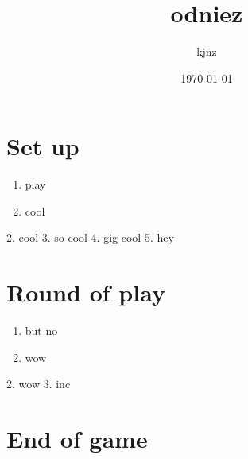 \documentclass{article}%
\title{odniez}%
\author{kjnz}%
\date{\today}%
\begin{document}
%
\pagestyle{empty}%
\normalsize%
\maketitle%
\section{ Set up
}%
\label{sec:Setup}%
\begin{enumerate}%
\item%
 play
%
\item%
 cool
%
\end{enumerate}%
2. cool
%
3. so cool
%
4. gig cool
%
5. hey


%
\section{ Round of play
}%
\label{sec:Roundofplay}%
\begin{enumerate}%
\item%
 but no
%
\item%
 wow
%
\end{enumerate}%
2. wow
%
3. inc


%
\section{ End of game}%
\label{sec:Endofgame}%

%
\end{document}
